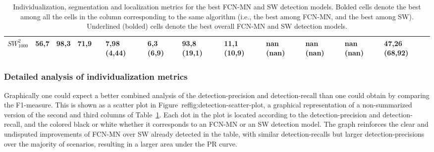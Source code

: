 \documentclass[a4paper,authoryear,review]{elsarticle}
\begin{document}
\begin{table}[]
\begin{adjustbox}{angle=90}
{\begin{tabular}{lllllllllllll}
			$SW_{1000}^{2}$ & 56,7 & 98,3 & 71,9 & \cellcolor[HTML]{E0C2CD}{\ul \textbf{0}} & 7,98 (4,44) & 6,3 (6,9) & 93,8 (19,1) & 11,1 (10,9) & nan (nan) & nan (nan) & nan (nan) & 47,26 (68,92) \\ \hline
		\end{tabular}}
	\end{adjustbox}
	\caption{Individualization, segmentation and localization metrics for the best FCN-MN and SW detection models. Bolded cells denote the best among all the cells in the column corresponding to the same algorithm (i.e., the best among FCN-MN, and the best among SW). Underlined (bolded) cells denote the best overall FCN-MN and SW detection models.}
		
		\label{tab:TablaXX}
	\end{table}


\subsubsection{Detailed analysis of individualization metrics} 
\label{sub:compFCNSW}


Graphically one could expect a better combined analysis of the detection-precision and detection-recall than one could obtain by comparing the F1-measure. This is shown as a scatter plot in Figure~ref{fig:detection-scatter-plot}, a graphical representation of a non-summarized version of the second and third columns of Table~\ref{tab:TablaXX}. Each dot  in the plot is located according to the detection-precision and detection-recall, and the colored black or white whether it corresponds to an FCN-MN or an SW detection model.
%
The graph reinforces the clear and undisputed improvements of FCN-MN over SW already detected in the table, with similar detection-recalls but larger detection-precisions over the majority of scenarios, resulting in a larger area under the PR curve. 
\end{document}
